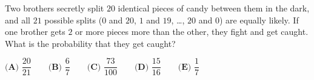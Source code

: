 Two brothers secretly split $20$ identical pieces of candy between them in the dark, and all $21$ possible splits ($0$ and $20$, $1$ and $19$, \dots, $20$ and $0$) are equally likely. If one brother gets $2$ or more pieces more than the other, they fight and get caught. What is the probability that they get caught?

$\textbf{(A) }\dfrac{20}{21}\qquad\textbf{(B) }\dfrac67\qquad\textbf{(C) }\dfrac{73}{100}\qquad\textbf{(D) }\dfrac{15}{16}\qquad\textbf{(E) }\dfrac17$
